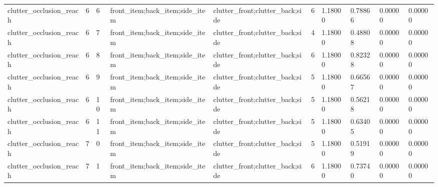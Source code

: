 \documentclass{article}
\begin{document}
\begin{table}[tbp]
{\begin{tabular}{llllllllll}
clutter\_occlusion\_reach & 6 & 6 & front\_item;back\_item;side\_item & clutter\_front;clutter\_back;side & 6 & 1.18000 & 0.78866 & 0.00000 & 0.00000 \\
clutter\_occlusion\_reach & 6 & 7 & front\_item;back\_item;side\_item & clutter\_front;clutter\_back;side & 4 & 1.18000 & 0.48808 & 0.00000 & 0.00000 \\
clutter\_occlusion\_reach & 6 & 8 & front\_item;back\_item;side\_item & clutter\_front;clutter\_back;side & 6 & 1.18000 & 0.82328 & 0.00000 & 0.00000 \\
clutter\_occlusion\_reach & 6 & 9 & front\_item;back\_item;side\_item & clutter\_front;clutter\_back;side & 5 & 1.18000 & 0.66567 & 0.00000 & 0.00000 \\
clutter\_occlusion\_reach & 6 & 10 & front\_item;back\_item;side\_item & clutter\_front;clutter\_back;side & 5 & 1.18000 & 0.56218 & 0.00000 & 0.00000 \\
clutter\_occlusion\_reach & 6 & 11 & front\_item;back\_item;side\_item & clutter\_front;clutter\_back;side & 5 & 1.18000 & 0.63405 & 0.00000 & 0.00000 \\
clutter\_occlusion\_reach & 7 & 0 & front\_item;back\_item;side\_item & clutter\_front;clutter\_back;side & 5 & 1.18000 & 0.51919 & 0.00000 & 0.00000 \\
clutter\_occlusion\_reach & 7 & 1 & front\_item;back\_item;side\_item & clutter\_front;clutter\_back;side & 6 & 1.18000 & 0.73740 & 0.00000 & 0.00000 \\
\bottomrule
\end{tabular}
}
\end{table}

\clearpage
\end{document}
